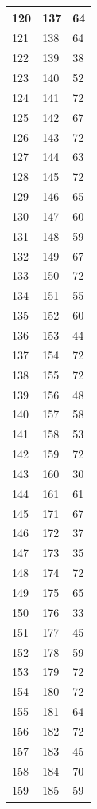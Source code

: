 \begin{tabular}{p{}p{}p{}}
\hline
120 & 137 & 64 \\
\hline
121 & 138 & 64 \\
\hline
122 & 139 & 38 \\
\hline
123 & 140 & 52 \\
\hline
124 & 141 & 72 \\
\hline
125 & 142 & 67 \\
\hline
126 & 143 & 72 \\
\hline
127 & 144 & 63 \\
\hline
128 & 145 & 72 \\
\hline
129 & 146 & 65 \\
\hline
130 & 147 & 60 \\
\hline
131 & 148 & 59 \\
\hline
132 & 149 & 67 \\
\hline
133 & 150 & 72 \\
\hline
134 & 151 & 55 \\
\hline
135 & 152 & 60 \\
\hline
136 & 153 & 44 \\
\hline
137 & 154 & 72 \\
\hline
138 & 155 & 72 \\
\hline
139 & 156 & 48 \\
\hline
140 & 157 & 58 \\
\hline
141 & 158 & 53 \\
\hline
142 & 159 & 72 \\
\hline
143 & 160 & 30 \\
\hline
144 & 161 & 61 \\
\hline
145 & 171 & 67 \\
\hline
146 & 172 & 37 \\
\hline
147 & 173 & 35 \\
\hline
148 & 174 & 72 \\
\hline
149 & 175 & 65 \\
\hline
150 & 176 & 33 \\
\hline
151 & 177 & 45 \\
\hline
152 & 178 & 59 \\
\hline
153 & 179 & 72 \\
\hline
154 & 180 & 72 \\
\hline
155 & 181 & 64 \\
\hline
156 & 182 & 72 \\
\hline
157 & 183 & 45 \\
\hline
158 & 184 & 70 \\
\hline
159 & 185 & 59 \\

\end{tabular}
